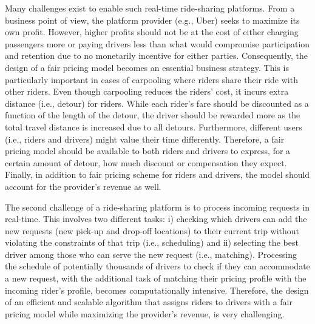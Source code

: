 Many challenges exist to enable such real-time ride-sharing platforms. From a business point of view, the platform provider (e.g., Uber) seeks to maximize its own profit. However, higher profits should not be at the cost of either charging passengers more or paying drivers less than what would compromise participation and retention due to no monetarily incentive for either parties. Consequently, the design of a fair pricing model becomes an essential business strategy. This is particularly important in cases of carpooling where riders share their ride with other riders. Even though carpooling reduces the riders' cost, it incurs extra distance (i.e., detour) for riders. While each rider's fare should be discounted as a function of the length of the detour, the driver should be rewarded more as the total travel distance is increased due to all detours. Furthermore, different users (i.e., riders and drivers) might value their time differently. Therefore, a fair pricing model should be available to both riders and drivers to express, for a certain amount of detour, how much discount or compensation they expect. Finally, in addition to fair pricing scheme for riders and drivers, the model should account for the provider's revenue as well.

The second challenge of a ride-sharing platform is to process incoming requests in real-time. This involves two different tasks: i) checking which drivers can add the new requests (new pick-up and drop-off locations) to their current trip without violating the constraints of that trip (i.e., scheduling) and ii) selecting the best driver among those who can serve the new request (i.e., matching). Processing the schedule of potentially thousands of drivers to check if they can accommodate a new request, with the additional task of matching their pricing profile with the incoming rider's profile, becomes computationally intensive. Therefore, the design of an efficient and scalable algorithm that assigns riders to drivers with a fair pricing model while maximizing the provider's revenue, is very challenging.



